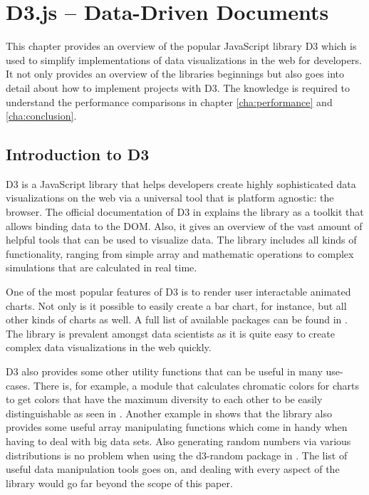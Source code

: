 \chapter{D3.js – Data-Driven Documents}
\label{cha:d3js}

This chapter provides an overview of the popular JavaScript library D3 \cite{D3Website} which is used to simplify implementations of data visualizations in the web for developers. It not only provides an overview of the libraries beginnings but also goes into detail about how to implement projects with D3. The knowledge is required to understand the performance comparisons in chapter \ref{cha:performance} and \ref{cha:conclusion}.


\section{Introduction to D3}

D3 is a JavaScript library that helps developers create highly sophisticated data visualizations on the web via a universal tool that is platform agnostic: the browser. The official documentation of D3 in \cite{D3Website} explains the library as a toolkit that allows binding data to the DOM. Also, it gives an overview of the vast amount of helpful tools that can be used to visualize data. The library includes all kinds of functionality, ranging from simple array and mathematic operations to complex simulations that are calculated in real time.

One of the most popular features of D3 is to render user interactable animated charts. Not only is it possible to easily create a bar chart, for instance, but all other kinds of charts as well. A full list of available packages can be found in \cite{D3Github}. The library is prevalent amongst data scientists as it is quite easy to create complex data visualizations in the web quickly.

D3 also provides some other utility functions that can be useful in many use-cases. There is, for example, a module that calculates chromatic colors for charts to get colors that have the maximum diversity to each other to be easily distinguishable as seen in \cite[/d3-scale-chromatic]{D3Github}. Another example in \cite[/d3-array]{D3Github} shows that the library also provides some useful array manipulating functions which come in handy when having to deal with big data sets. Also generating random numbers via various distributions is no problem when using the d3-random package in \cite[/d3-random]{D3Github}. The list of useful data manipulation tools goes on, and dealing with every aspect of the library would go far beyond the scope of this paper. 

